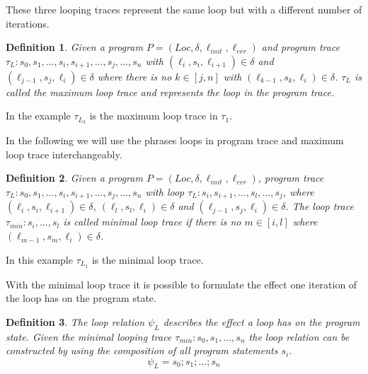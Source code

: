 \documentclass{article}
\newcommand{\Loc}{\ensuremath{\mathit{Loc}}\xspace}
\newcommand{\err}{\ensuremath{\mathit{err}}\xspace}
\newcommand{\init}{\ensuremath{\mathit{init}}\xspace}
\newcounter{example}[section]
\newtheorem{mydef}{Definition}
\newcommand\mycom[1]{}
\newcommand\mycom[1]{#1}
\newcommand{\dd}[1]{\mycom{\todo[color=orange!40,inline]{\small DD: #1}}}
\newcommand{\ts}[1]{\mycom{\todo[color=green!40,inline]{\small TS: #1}}}
\begin{document}
These three looping traces represent the same loop but with a different number of iterations.

\ts{The definition of loop trace also includes the traces starting with $\ell_4$ or $\ell_5$. Why do they not appear here? Or do you want to exclude them from the definition?}
\dd{Also: It seems unnecessary to have so many pictures of the relatively simple idea (a trace contains loop unwindings)}


\begin{mydef}
    Given a program $P = (\Loc, \delta, \ell_\init, \ell_\err)$ and program trace \\ $\tau_L: s_0, s_1, \ldots, s_i, s_{i+1}, \ldots, s_j, \ldots, s_n$ with $(\ell_i, s_i, \ell_{i+1}) \in \delta$ and $(\ell_{j-1}, s_j, \ell_i) \in \delta$ where there is no $k \in [j, n]$ with $(\ell_{k-1}, s_k, \ell_i) \in \delta$. $\tau_L$ is called the maximum loop trace and represents the loop in the program trace.
\end{mydef}
\ts{In the definition above, a loop trace is a sub trace starting with the loop head. 
Shouldn't $\tau_L$ then also start with the loop head? 
Otherwise, $\tau_{L_3}$ does not match the definition.}
In the example $\tau_{L_3}$ is the maximum loop trace in $\tau_1$. 
\dd{which example?}
In the following we will use the phrases loops in program trace and maximum loop trace interchangeably. 

\begin{mydef}
    Given a program $P = (\Loc, \delta, \ell_\init, \ell_\err)$, program trace \\ $\tau_L: s_0, s_1, \ldots, s_i, s_{i+1}, \ldots, s_j, \ldots, s_n$ with loop $\tau_L: s_i, s_{i+1}, \ldots, s_l, \ldots, s_j$, where $(\ell_i, s_i, \ell_{i+1}) \in \delta$, $(\ell_l, s_l, \ell_i) \in \delta$ and $(\ell_{j-1}, s_j, \ell_i) \in \delta$. The loop trace $\tau_{min}: s_i, \ldots, s_l$ is called minimal loop trace if there is no $m \in [i, l]$ where $(\ell_{m-1}, s_m, \ell_i) \in \delta$.
\end{mydef}
\ts{Complicated. I don't think you need a loop containing another loop for this definition.}

In this example $\tau_{L_1}$ is the minimal loop trace. 
\dd{which example?}

With the minimal loop trace it is possible to formulate the effect one iteration of the loop has on the program state.
\begin{mydef}
    The loop relation $\psi_L$ describes the effect a loop has on the program state.
    Given the minimal looping trace $\tau_{min}: s_0, s_1, \ldots, s_{n}$ the loop relation can be constructed by using the composition of all program statements $s_i$.
    \begin{equation*}
        \psi_L = s_0; s_1; \ldots; s_n
    \end{equation*}
\end{mydef}
\dd{Dont switch between ``loop trace'' and ``looping trace''}
\end{document}
